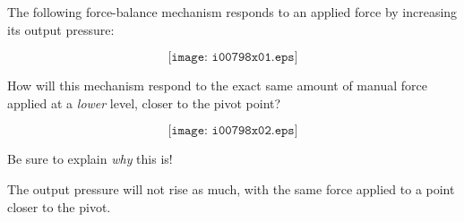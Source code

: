 

The following force-balance mechanism responds to an applied force by increasing its output pressure:

$$\texttt{[image: i00798x01.eps]}$$

How will this mechanism respond to the exact same amount of manual force applied at a {\it lower} level, closer to the pivot point?

$$\texttt{[image: i00798x02.eps]}$$

Be sure to explain {\it why} this is!







The output pressure will not rise as much, with the same force applied to a point closer to the pivot.










